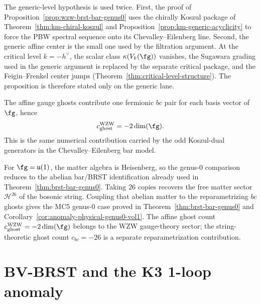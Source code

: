 \begin{remark}
\label{rem:wzw-brst-bar-generic-level}
The generic-level hypothesis is used twice. First, the proof of
Proposition~\ref{prop:wzw-brst-bar-genus0} uses the chirally Koszul
package of Theorem~\ref{thm:km-chiral-koszul} and
Proposition~\ref{prop:km-generic-acyclicity} to force the PBW
spectral sequence onto its Chevalley--Eilenberg line. Second, the
generic affine center is the small one used by the filtration
argument. At the critical level $k=-h^\vee$, the scalar class
$\kappa(V_k(\fg))$ vanishes, the Sugawara grading used in the generic
argument is replaced by the separate critical package, and the
Feigin--Frenkel center jumps
\textup{(}Theorem~\ref{thm:critical-level-structure}\textup{)}.
The proposition is therefore stated only on the generic lane.

The affine gauge ghosts contribute one fermionic $bc$ pair for each
basis vector of~$\fg$, hence
\[
 c_{\mathrm{ghost}}^{\mathrm{WZW}} = -2\dim(\fg).
\]
This is the same numerical contribution carried by the odd
Koszul-dual generators in the Chevalley--Eilenberg bar model.

For $\fg = \mathfrak{u}(1)$, the matter algebra is Heisenberg, so the
genus-$0$ comparison reduces to the abelian bar/BRST identification
already used in Theorem~\ref{thm:brst-bar-genus0}. Taking $26$
copies recovers the free matter sector $\mathcal{H}^{26}$ of the
bosonic string. Coupling that abelian matter to the reparametrizing
$bc$ ghosts gives the MC5 genus-$0$ case proved in
Theorem~\ref{thm:brst-bar-genus0} and
Corollary~\ref{cor:anomaly-physical-genus0-vol1}. The affine ghost count
$c_{\mathrm{ghost}}^{\mathrm{WZW}} = -2\dim(\fg)$ belongs to the WZW
gauge-theory sector; the string-theoretic ghost count
$c_{bc} = -26$ is a separate reparametrization contribution.
\end{remark}

\section{BV-BRST and the K3 1-loop anomaly}
\label{sec:bvbrst-supplement}

